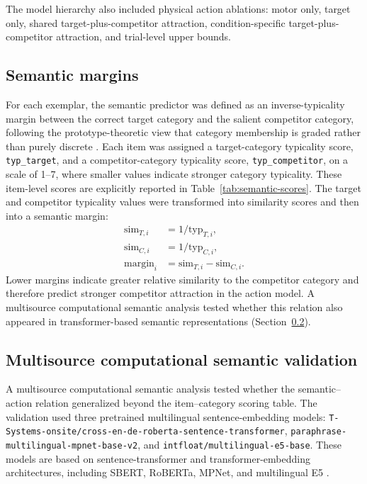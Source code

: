 \documentclass[11pt,final]{article}
\begin{document}
The model hierarchy also included physical action ablations: motor only, target only, shared target-plus-competitor attraction, condition-specific target-plus-competitor attraction, and trial-level upper bounds.

\subsection{Semantic margins}

For each exemplar, the semantic predictor was defined as an inverse-typicality margin between the correct target category and the salient competitor category, following the prototype-theoretic view that category membership is graded rather than purely discrete \citep{rosch1975family}. Each item was assigned a target-category typicality score, \texttt{typ\_target}, and a competitor-category typicality score, \texttt{typ\_competitor}, on a scale of 1--7, where smaller values indicate stronger category typicality. These item-level scores are explicitly reported in Table~\ref{tab:semantic-scores}. The target and competitor typicality values were transformed into similarity scores and then into a semantic margin:
\begin{align}
\mathrm{sim}_{T,i} &= 1 / \mathrm{typ}_{T,i},\\
\mathrm{sim}_{C,i} &= 1 / \mathrm{typ}_{C,i},\\
\mathrm{margin}_i &= \mathrm{sim}_{T,i} - \mathrm{sim}_{C,i}.
\end{align}
Lower margins indicate greater relative similarity to the competitor category and therefore predict stronger competitor attraction in the action model. A multisource computational semantic analysis tested whether this relation also appeared in transformer-based semantic representations (Section~\ref{sec:multisource-margin}).



\subsection{Multisource computational semantic validation}
\label{sec:multisource-margin}

A multisource computational semantic analysis tested whether the semantic--action relation generalized beyond the item--category scoring table. The validation used three pretrained multilingual sentence-embedding models: \texttt{T-Systems-onsite/cross-en-de-roberta-sentence-transformer}, \texttt{paraphrase-multilingual-mpnet-base-v2}, and \texttt{intfloat/multilingual-e5-base}. These models are based on sentence-transformer and transformer-embedding architectures, including SBERT, RoBERTa, MPNet, and multilingual E5 \citep{reimers2019sentence,liu2019roberta,song2020mpnet,wang2024multilingual}.
\end{document}
